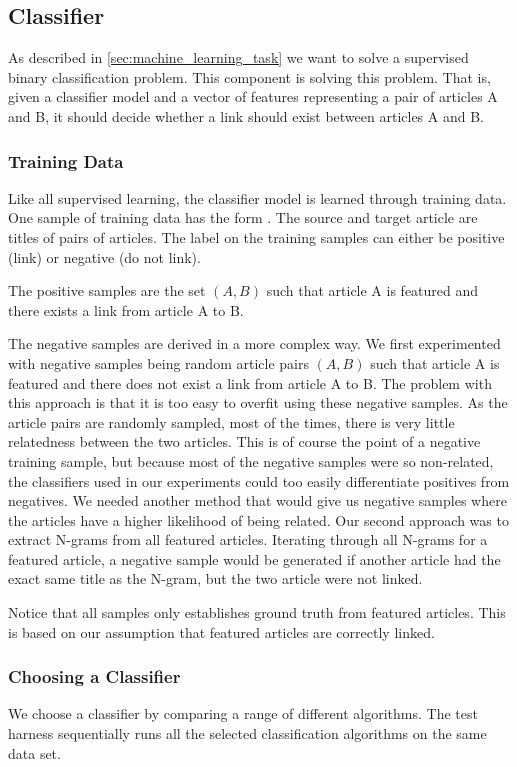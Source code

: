 \subsection{Classifier}
As described in \cref{sec:machine_learning_task} we want to solve a supervised binary classification problem. This component is solving this problem. That is, given a classifier model and a vector of features representing a pair of articles A and B, it should decide whether a link should exist between articles A and B.

\subsubsection{Training Data}
Like all supervised learning, the classifier model is learned through training data. One sample of training data has the form . The source and target article are titles of pairs of articles. The label on the training samples can either be positive (link) or negative (do not link).

The positive samples are the set $(A,B)$ such that article A is featured and there exists a link from article A to B.

The negative samples are derived in a more complex way. We first experimented with negative samples being random article pairs $(A,B)$ such that article A is featured and there does not exist a link from article A to B. The problem with this approach is that it is too easy to overfit using these negative samples. As the article pairs are randomly sampled, most of the times, there is very little relatedness between the two articles. This is of course the point of a negative training sample, but because most of the negative samples were so non-related, the classifiers used in our experiments could too easily differentiate positives from negatives. We needed another method that would give us negative samples where the articles have a higher likelihood of being related. Our second approach was to extract N-grams from all featured articles. Iterating through all N-grams for a featured article, a negative sample would be generated if another article had the exact same title as the N-gram, but the two article were not linked.

Notice that all samples only establishes ground truth from featured articles. This is based on our assumption that featured articles are correctly linked.

\subsubsection{Choosing a Classifier}
We choose a classifier by comparing a range of different algorithms. The test harness sequentially runs all the selected classification algorithms on the same data set.


